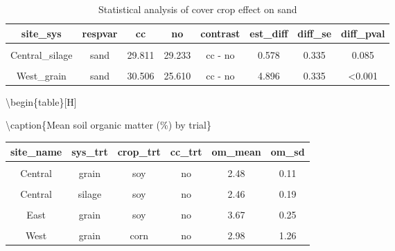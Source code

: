 \documentclass[
]{article}
\begin{document}
\begin{table}[H]

\caption{\label{tab:texture}Statistical analysis of cover crop effect on sand}
\centering
\begin{tabular}[t]{cccccccc}
\toprule
site\_sys & respvar & cc & no & contrast & est\_diff & diff\_se & diff\_pval\\
\midrule
\cellcolor{gray!6}{Central\_grain} & \cellcolor{gray!6}{sand} & \cellcolor{gray!6}{32.486} & \cellcolor{gray!6}{31.600} & \cellcolor{gray!6}{cc - no} & \cellcolor{gray!6}{0.886} & \cellcolor{gray!6}{0.299} & \cellcolor{gray!6}{0.003}\\
Central\_silage & sand & 29.811 & 29.233 & cc - no & 0.578 & 0.335 & 0.085\\
\cellcolor{gray!6}{East\_grain} & \cellcolor{gray!6}{sand} & \cellcolor{gray!6}{12.715} & \cellcolor{gray!6}{9.837} & \cellcolor{gray!6}{cc - no} & \cellcolor{gray!6}{2.877} & \cellcolor{gray!6}{0.335} & \cellcolor{gray!6}{<0.001}\\
West\_grain & sand & 30.506 & 25.610 & cc - no & 4.896 & 0.335 & <0.001\\
\bottomrule
\end{tabular}
\end{table}

\textbackslash begin\{table\}{[}H{]}

\textbackslash caption\{\label{tab:om}Mean soil organic matter (\%) by
trial\} \centering

\begin{tabular}[t]{cccccc}
\toprule
site\_name & sys\_trt & crop\_trt & cc\_trt & om\_mean & om\_sd\\
\midrule
\cellcolor{gray!6}{Central} & \cellcolor{gray!6}{grain} & \cellcolor{gray!6}{soy} & \cellcolor{gray!6}{cc} & \cellcolor{gray!6}{2.36} & \cellcolor{gray!6}{0.23}\\
\cmidrule{1-6}
Central & grain & soy & no & 2.48 & 0.11\\
\cmidrule{1-6}
\cellcolor{gray!6}{Central} & \cellcolor{gray!6}{silage} & \cellcolor{gray!6}{soy} & \cellcolor{gray!6}{cc} & \cellcolor{gray!6}{2.64} & \cellcolor{gray!6}{0.29}\\
\cmidrule{1-6}
Central & silage & soy & no & 2.46 & 0.19\\
\cmidrule{1-6}
\cellcolor{gray!6}{East} & \cellcolor{gray!6}{grain} & \cellcolor{gray!6}{soy} & \cellcolor{gray!6}{cc} & \cellcolor{gray!6}{3.58} & \cellcolor{gray!6}{0.17}\\
\cmidrule{1-6}
East & grain & soy & no & 3.67 & 0.25\\
\cmidrule{1-6}
\cellcolor{gray!6}{West} & \cellcolor{gray!6}{grain} & \cellcolor{gray!6}{corn} & \cellcolor{gray!6}{cc} & \cellcolor{gray!6}{2.75} & \cellcolor{gray!6}{1.24}\\
\cmidrule{1-6}
West & grain & corn & no & 2.98 & 1.26\\
\bottomrule
\end{tabular}
\end{document}
